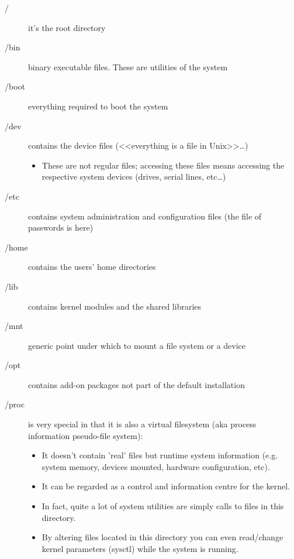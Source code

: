 \documentclass{article}
\begin{document}
                            \begin{description}
                                \item[/] it’s the root directory
                                \item[/bin] binary executable files. These are utilities of the system
                                \item[/boot] everything required to boot the system
                                \item[/dev] contains the device files (<<everything is a file in Unix>>\dots)
                                \begin{itemize}
                                    \item These are not regular files; accessing these files means accessing the respective system devices (drives, serial lines, etc…)
                                \end{itemize}
                                \item[/etc] contains system administration and configuration files (the file of passwords is here)
                                \item[/home] contains the users’ home directories
                                \item[/lib] contains kernel modules and the shared libraries
                                \item[/mnt] generic point under which to mount a file system or a device
                                \item[/opt] contains add-on packages not part of the default installation
                                \item[/proc] is very special in that it is also a virtual filesystem (aka process information pseudo-file system):
                                \begin{itemize}
                                    \item It doesn't contain 'real' files but runtime system information (e.g. system memory, devices mounted, hardware configuration, etc).
                                    \item It can be regarded as a control and information centre for the kernel.
                                    \item In fact, quite a lot of system utilities are simply calls to files in this directory.
                                    \item By altering files located in this directory you can even read/change kernel parameters (sysctl) while the system is running.

\end{itemize}
\end{description}
\end{document}
